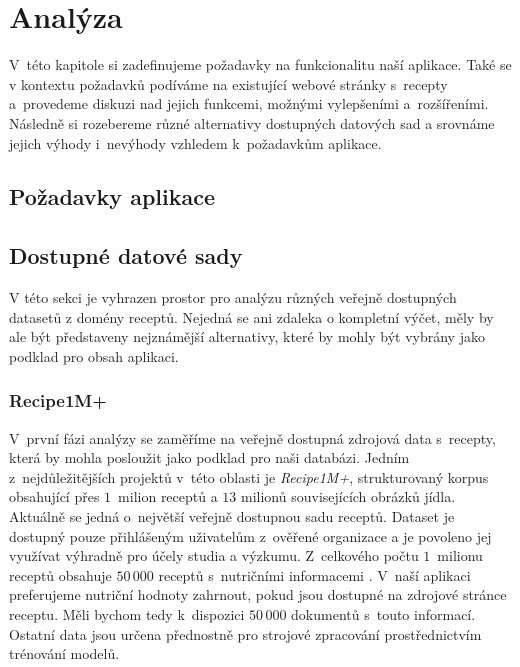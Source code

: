 
\chapter{Analýza}

V~této kapitole si zadefinujeme požadavky na funkcionalitu naší aplikace. Také se v kontextu požadavků podíváme na existující webové stránky s~recepty a~provedeme diskuzi nad jejich funkcemi, možnými vylepšeními a~rozšířeními. Následně si rozebereme různé alternativy dostupných datových sad a srovnáme jejich výhody i~nevýhody vzhledem k~požadavkům aplikace.

\section{Požadavky aplikace}

\section{Dostupné datové sady}

V této sekci je vyhrazen prostor pro analýzu různých veřejně dostupných datasetů z domény receptů. Nejedná se ani zdaleka o kompletní výčet, měly by ale být představeny nejznámější alternativy, které by mohly být vybrány jako podklad pro obsah aplikaci. 

\subsection{Recipe1M+}

V~první fázi analýzy se zaměříme na veřejně dostupná zdrojová data s~recepty, která by mohla posloužit jako podklad pro naši databázi. Jedním z~nejdůležitějších projektů v~této oblasti je \emph{Recipe1M+}, strukturovaný korpus obsahující přes $1$~milion receptů a $13$ milionů souvisejících obrázků jídla. Aktuálně se jedná o~největší veřejně dostupnou sadu receptů. Dataset je dostupný pouze přihlášeným uživatelům z~ověřené organizace a je povoleno jej využívat výhradně pro účely studia a výzkumu. Z~celkového počtu $1$~milionu receptů obsahuje $50\,000$ receptů s~nutričními informacemi \citep{marin2019learning}. V~naší aplikaci preferujeme nutriční hodnoty zahrnout, pokud jsou dostupné na zdrojové stránce receptu. Měli bychom tedy k~dispozici $50\,000$ dokumentů s~touto informací. Ostatní data jsou určena přednostně pro strojové zpracování prostřednictvím trénování modelů.

